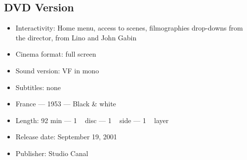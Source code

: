 \subsection*{DVD Version}

\begin{itemize}
    \item Interactivity: Home menu, access to scenes, filmographies
drop-downs from the director, from Lino  and John
    \familyname Gabin{}
    \item Cinema format: full screen
    \item Sound version: VF in mono
    \item Subtitles: none
    \item France --- 1953 --- Black \& white
     \item Length: 92 min --- 1 ~ disc --- 1 ~ side --- 1 ~ layer
    \item Release date: September 19, 2001
    \item Publisher: Studio Canal
\end{itemize}
